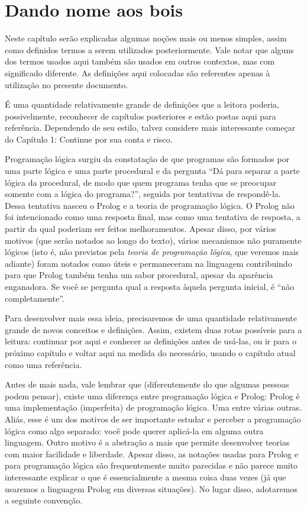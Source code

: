 \documentclass{article}
\theoremstyle{definition}
\theoremstyle{remark}
\begin{document}
\section{Dando nome aos bois}

Neste capítulo serão explicadas algumas noções mais ou menos simples, assim como definidos termos a serem utilizados posteriormente. Vale notar que alguns dos termos usados aqui também são usados em outros contextos, mas com significado diferente. As definições aqui colocadas são referentes apenas à utilização no presente documento.\par
É uma quantidade relativamente grande de definições que a leitora poderia, possivelmente, reconhecer de capítulos posteriores e estão postas aqui para referência. Dependendo de seu estilo, talvez considere mais interessante começar do Capítulo 1: Continue por sua conta e risco. %

Programação lógica surgiu da constatação de que programas são formados por uma parte lógica e uma parte procedural e da pergunta ``Dá para separar a parte lógica da procedural, de modo que quem programa tenha que se preocupar somente com a lógica do programa?'', seguida por tentativas de respondê-la. Dessa tentativa nasceu o Prolog e a teoria de programação lógica. O Prolog não foi intencionado %
como uma resposta final, mas como uma tentativa de resposta, a partir da qual poderiam ser feitos
melhoramentos. Apesar disso, por vários motivos (que serão notados ao longo do texto), vários mecanismos não puramente lógicos (isto é, não previstos pela \textit{teoria de programação lógica}, que veremos mais adiante) foram notados como úteis e permaneceram na linguagem contribuindo para que Prolog também tenha um sabor procedural, apesar da aparência enganadora. Se você se pergunta qual a resposta àquela pergunta inicial, é ``não completamente''.\par

Para desenvolver mais essa ideia, precisaremos de uma quantidade relativamente grande de novos conceitos e definições. Assim, existem duas rotas possíveis para a leitura: continuar por aqui e conhecer as definições antes de usá-las, ou ir para o próximo capítulo e voltar aqui na medida do necessário, usando o capítulo atual como uma referência.


Antes de mais nada, vale lembrar que (diferentemente do que algumas pessoas podem pensar), existe uma diferença entre programação lógica e Prolog: Prolog é uma implementação (imperfeita) de programação lógica. Uma entre várias outras. Aliás, esse é um dos motivos de ser importante estudar e perceber a programação lógica como algo separado: você pode querer aplicá-la em alguma outra linguagem. Outro motivo é a abstração a mais que permite desenvolver teorias com maior facilidade e liberdade. Apesar
disso, as notações usadas para Prolog e para programação lógica são frequentemente muito parecidas e não parece muito interessante explicar o que é essencialmente a mesma coisa duas vezes (já que usaremos a linguagem Prolog em diversas situações). No lugar disso, adotaremos a seguinte convenção.
\end{document}
